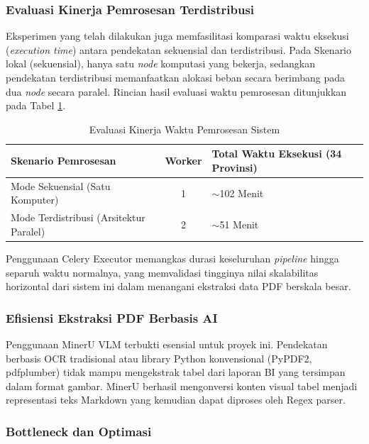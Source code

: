 \documentclass[10pt, a4paper, twocolumn]{article}
\begin{document}
\subsubsection{Evaluasi Kinerja Pemrosesan Terdistribusi}

Eksperimen yang telah dilakukan juga memfasilitasi komparasi waktu eksekusi (\textit{execution time}) antara pendekatan sekuensial dan terdistribusi. Pada Skenario lokal (sekuensial), hanya satu \textit{node} komputasi yang bekerja, sedangkan pendekatan terdistribusi memanfaatkan alokasi beban secara berimbang pada dua \textit{node} secara paralel. Rincian hasil evaluasi waktu pemrosesan ditunjukkan pada Tabel \ref{tab:performance_eval}.

\begin{table}[H]
\centering
\caption{Evaluasi Kinerja Waktu Pemrosesan Sistem}
\label{tab:performance_eval}
\fontsize{8}{10}\selectfont
\begin{tabularx}{\linewidth}{|>{\raggedright\arraybackslash}X|c|>{\raggedright\arraybackslash}X|}
\hline
\textbf{Skenario Pemrosesan} & \textbf{Worker} & \textbf{Total Waktu Eksekusi (34 Provinsi)} \\
\hline
Mode Sekuensial (Satu Komputer) & 1 & $\sim$102 Menit \\
\hline
Mode Terdistribusi (Arsitektur Paralel) & 2 & $\sim$51 Menit \\
\hline
\end{tabularx}
\end{table}

Penggunaan Celery Executor memangkas durasi keseluruhan \textit{pipeline} hingga separuh waktu normalnya, yang memvalidasi tingginya nilai skalabilitas horizontal dari sistem ini dalam menangani ekstraksi data PDF berskala besar.

\subsubsection{Efisiensi Ekstraksi PDF Berbasis AI}

Penggunaan MinerU VLM terbukti esensial untuk proyek ini. Pendekatan berbasis OCR tradisional atau library Python konvensional (PyPDF2, pdfplumber) tidak mampu mengekstrak tabel dari laporan BI yang tersimpan dalam format gambar. MinerU berhasil mengonversi konten visual tabel menjadi representasi teks Markdown yang kemudian dapat diproses oleh Regex parser.

\subsubsection{Bottleneck dan Optimasi}
\end{document}

